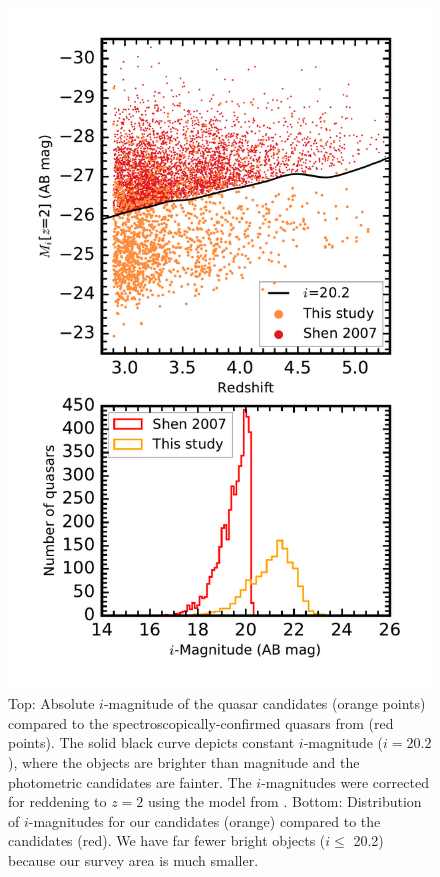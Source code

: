 \documentclass[apj, numberedappendix]{emulateapj}
\begin{document}
 \begin{figure}[h!]
 \centering
 \includegraphics[scale=0.5]{./New_Plots/Absolute_Mag_SpIES_Shen.pdf}
 \caption{\footnotesize{Top: Absolute $i$-magnitude of the quasar candidates (orange points) compared to the spectroscopically-confirmed quasars from \citet{Shen2007} (red points). The solid black curve depicts constant $i$-magnitude ($i=20.2$), where the \citet{Shen2007} objects are brighter than magnitude and the photometric candidates are fainter. The $i$-magnitudes were corrected for reddening to $z=2$ using the model from \citet{Richards2006}. Bottom: Distribution of $i$-magnitudes for our candidates (orange) compared to the \citet{Shen2007} candidates (red). We have far fewer bright objects ($i\leq$ 20.2) because our survey area is much smaller.}}
 \label{fig:Abs_mag}
 \end{figure}
 
\end{document}
